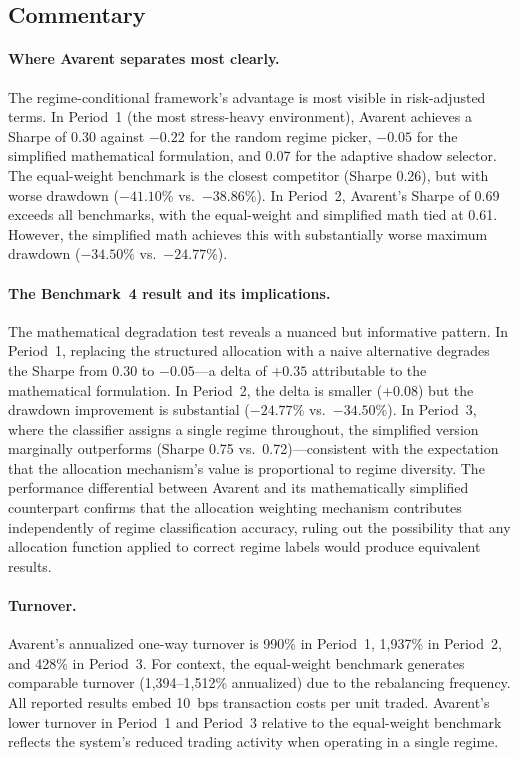 \documentclass[12pt]{article}
\begin{document}
\subsection{Commentary}

\paragraph{Where Avarent separates most clearly.}
The regime-conditional framework's advantage is most visible in risk-adjusted terms.
In Period~1 (the most stress-heavy environment), Avarent achieves a Sharpe of 0.30 against $-0.22$ for the random regime picker, $-0.05$ for the simplified mathematical formulation, and 0.07 for the adaptive shadow selector.
The equal-weight benchmark is the closest competitor (Sharpe 0.26), but with worse drawdown ($-41.10\%$ vs.\ $-38.86\%$).
In Period~2, Avarent's Sharpe of 0.69 exceeds all benchmarks, with the equal-weight and simplified math tied at 0.61.
However, the simplified math achieves this with substantially worse maximum drawdown ($-34.50\%$ vs.\ $-24.77\%$).

\paragraph{The Benchmark~4 result and its implications.}
The mathematical degradation test reveals a nuanced but informative pattern.
In Period~1, replacing the structured allocation with a naive alternative degrades the Sharpe from 0.30 to $-0.05$---a delta of $+0.35$ attributable to the mathematical formulation.
In Period~2, the delta is smaller ($+0.08$) but the drawdown improvement is substantial ($-24.77\%$ vs.\ $-34.50\%$).
In Period~3, where the classifier assigns a single regime throughout, the simplified version marginally outperforms (Sharpe 0.75 vs.\ 0.72)---consistent with the expectation that the allocation mechanism's value is proportional to regime diversity.
The performance differential between Avarent and its mathematically simplified counterpart confirms that the allocation weighting mechanism contributes independently of regime classification accuracy, ruling out the possibility that any allocation function applied to correct regime labels would produce equivalent results.

\paragraph{Turnover.}
Avarent's annualized one-way turnover is 990\% in Period~1, 1{,}937\% in Period~2, and 428\% in Period~3.
For context, the equal-weight benchmark generates comparable turnover (1{,}394--1{,}512\% annualized) due to the rebalancing frequency.
All reported results embed 10~bps transaction costs per unit traded.
Avarent's lower turnover in Period~1 and Period~3 relative to the equal-weight benchmark reflects the system's reduced trading activity when operating in a single regime.
\end{document}
